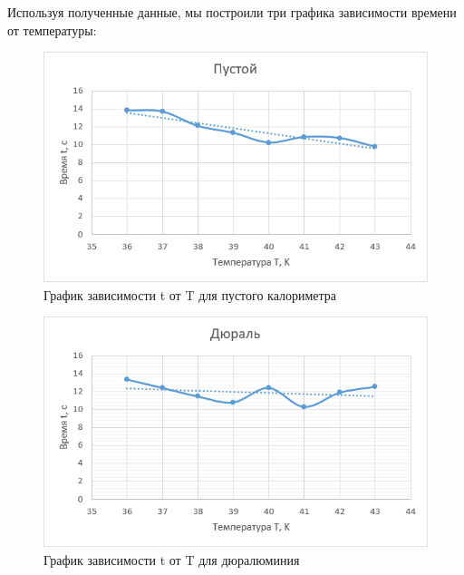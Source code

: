 \documentclass[a4paper,12pt]{article}
\begin{document}
\newpage
\hspace{\parindent}Используя полученные данные, мы построили три графика зависимости времени от температуры:
\begin{figure}[h!]
	\begin{center}
		\includegraphics[scale=1]{1}
	\end{center}
	\caption{График зависимости t от T для пустого калориметра}
	
\end{figure}

\begin{figure}[h!]
	\begin{center}
		\includegraphics[scale=1]{2}
	\end{center}
	\caption{График зависимости t от T для дюралюминия}
	
\end{figure}
\end{document}
